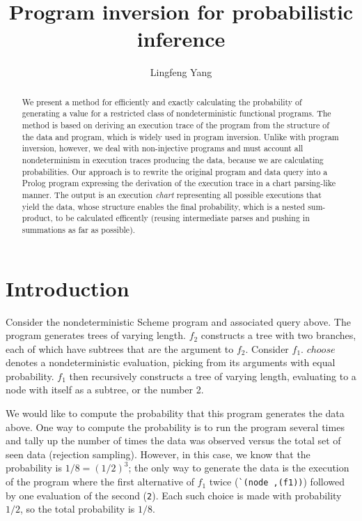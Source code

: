 \documentclass{acmsiggraph}
\begin{document}
\title{Program inversion for probabilistic inference}

\author{Lingfeng Yang}
\maketitle

\begin{abstract}

We present a method for efficiently and exactly calculating the probability of
generating a value for a restricted class of nondeterministic functional
programs. The method is based on deriving an execution trace of the program
from the structure of the data and program, which is widely used in program
inversion.  Unlike with program inversion, however, we deal with non-injective
programs and must account all nondeterminism in execution traces producing the
data, because we are calculating probabilities.  Our approach is to rewrite the
original program and data query into a Prolog program expressing the derivation
of the execution trace in a chart parsing-like manner.  The output is an
execution \textit{chart} representing all possible executions that yield the
data, whose structure enables the final probability, which is a nested
sum-product, to be calculated efficently (reusing intermediate parses and
pushing in summations as far as possible).

\end{abstract}

\section{Introduction}

\lstset{language = LISP}



Consider the nondeterministic Scheme program and associated query above.
The program generates trees of varying length.  $f_2$ constructs a tree with two
branches, each of which have subtrees that are the argument to $f_2$.  Consider
$f_1$. $choose$ denotes a nondeterministic evaluation, picking from its
arguments with equal probability.  $f_1$ then recursively constructs a tree of
varying length, evaluating to a node with itself as a subtree, or the number 2.

We would like to compute the probability that this program generates the data
above.  One way to compute the probability is to run the program several times
and tally up the number of times the data was observed versus the total set of
seen data (rejection sampling). However, in this case, we know that the
probability is $1/8 = (1/2)^3$; the only way to generate the data is the
execution of the program where the first alternative of $f_1$ twice
(\verb!`(node ,(f1))!) followed by one evaluation of the second (\verb!2!).
Each such choice is made with probability $1/2$, so the total probability is
$1/8$.
\end{document}
